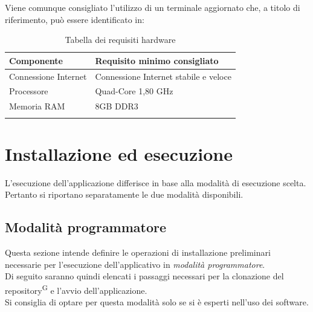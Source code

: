     Viene comunque consigliato l'utilizzo di un terminale aggiornato che, a titolo di riferimento, può essere identificato in:
    \begin{xltabular}{\textwidth}{ X | X}

        \textbf{\color{white} Componente} & \textbf{\color{white} Requisito minimo consigliato}\\ 
        \hline
        \endhead
        
        Connessione Internet & Connessione Internet stabile e veloce \\
        \hline

        Processore & Quad-Core 1,80 GHz \\
        \hline
        
        Memoria RAM & 8GB DDR3 \\
        \hline

        \caption{Tabella dei requisiti hardware}
        \label{tab:requisiti:hard}
    \end{xltabular}

    \newpage

    

\section{Installazione ed esecuzione}\label{sec:install_run}
    L'esecuzione dell'applicazione differisce in base alla modalità di esecuzione scelta. Pertanto si riportano separatamente le due modalità disponibili. 

    \subsection{Modalità programmatore}\label{sec:install_run:esperto}
    Questa sezione intende definire le operazioni di installazione preliminari necessarie per l'esecuzione dell'applicativo in \textit{modalità programmatore}.\\ 
    Di seguito saranno quindi elencati i passaggi necessari per la clonazione del repository\textsuperscript{G} e l'avvio dell'applicazione. \\
    Si consiglia di optare per questa modalità solo se si è esperti nell'uso dei software.
    
